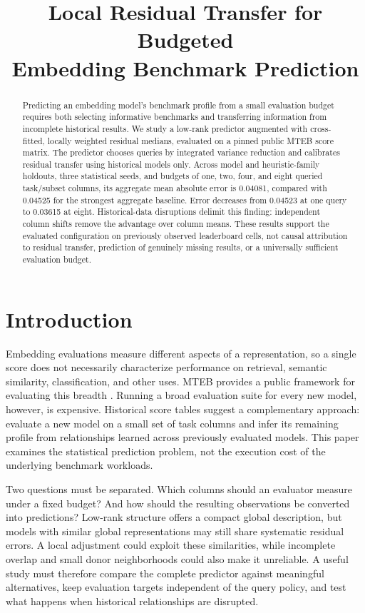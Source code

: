 \documentclass{article}
\title{Local Residual Transfer for Budgeted\\Embedding Benchmark Prediction}
\author{}
\begin{document}
\maketitle

\begin{abstract}
Predicting an embedding model's benchmark profile from a small evaluation budget requires both selecting informative benchmarks and transferring information from incomplete historical results. We study a low-rank predictor augmented with cross-fitted, locally weighted residual medians, evaluated on a pinned public MTEB score matrix. The predictor chooses queries by integrated variance reduction and calibrates residual transfer using historical models only. Across model and heuristic-family holdouts, three statistical seeds, and budgets of one, two, four, and eight queried task/subset columns, its aggregate mean absolute error is 0.04081, compared with 0.04525 for the strongest aggregate baseline. Error decreases from 0.04523 at one query to 0.03615 at eight. Historical-data disruptions delimit this finding: independent column shifts remove the advantage over column means. These results support the evaluated configuration on previously observed leaderboard cells, not causal attribution to residual transfer, prediction of genuinely missing results, or a universally sufficient evaluation budget.
\end{abstract}

\section{Introduction}
Embedding evaluations measure different aspects of a representation, so a single score does not necessarily characterize performance on retrieval, semantic similarity, classification, and other uses. MTEB provides a public framework for evaluating this breadth \citep{MTEB}. Running a broad evaluation suite for every new model, however, is expensive. Historical score tables suggest a complementary approach: evaluate a new model on a small set of task columns and infer its remaining profile from relationships learned across previously evaluated models. This paper examines the statistical prediction problem, not the execution cost of the underlying benchmark workloads.

Two questions must be separated. Which columns should an evaluator measure under a fixed budget? And how should the resulting observations be converted into predictions? Low-rank structure offers a compact global description, but models with similar global representations may still share systematic residual errors. A local adjustment could exploit these similarities, while incomplete overlap and small donor neighborhoods could also make it unreliable. A useful study must therefore compare the complete predictor against meaningful alternatives, keep evaluation targets independent of the query policy, and test what happens when historical relationships are disrupted.
\end{document}
